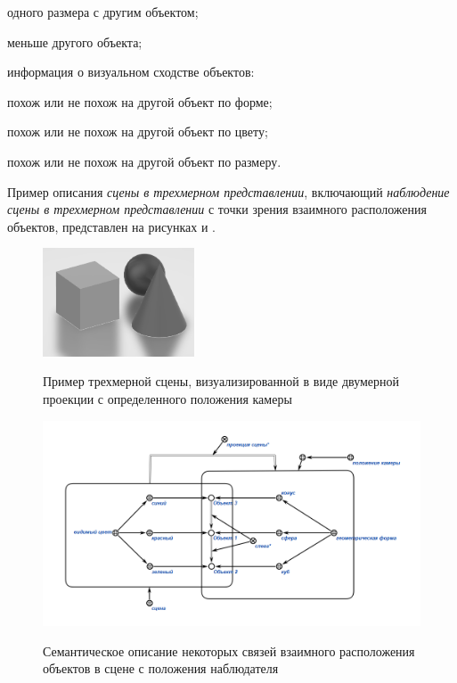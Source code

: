 \begin{textitemize}
\begin{textitemize}
        \item одного размера с другим объектом;
        \item меньше другого объекта;
    \end{textitemize}
    \item информация о визуальном сходстве объектов:
    \begin{textitemize}
        \item похож или не похож на другой объект по форме;
        \item похож или не похож на другой объект по цвету;
        \item похож или не похож на другой объект по размеру.
    \end{textitemize}
\end{textitemize}


Пример описания \textit{сцены в трехмерном представлении}, включающий \textit{наблюдение сцены в трехмерном представлении} с точки зрения взаимного расположения объектов, представлен на рисунках \textit{} и \textit{}.

\begin{figure}[H]
    \caption{Пример трехмерной сцены, визуализированной в виде двумерной проекции с определенного положения камеры}
    \includegraphics[scale=0.8, width=0.4\textwidth]{author/part4/figures/scene-example.png}
    \label{fig:scene-example}
\end{figure}

\begin{figure}[H]
    \caption{Семантическое описание некоторых связей взаимного расположения объектов в сцене с положения наблюдателя}
    \includegraphics[scale=0.8, width=1.0\textwidth]{author/part4/figures/scene-description.png}
    \label{fig:scene-description}
\end{figure}

